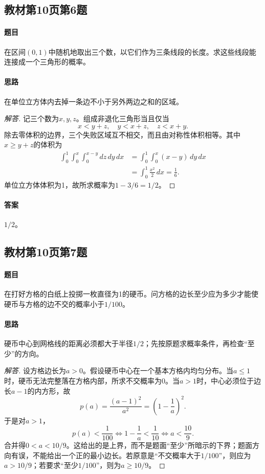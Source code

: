 \subsection{教材第10页第6题}\label{ex:w01-t6}
\paragraph{题目}
在区间$(0,1)$中随机地取出三个数，以它们作为三条线段的长度。求这些线段能连接成一个三角形的概率。
\paragraph{思路}在单位立方体内去掉一条边不小于另外两边之和的区域。
\begin{proof}[解答]
记三个数为$x,y,z$。组成非退化三角形当且仅当
\[x<y+z,\quad y<x+z,\quad z<x+y.\]
除去零体积的边界，三个失败区域互不相交，而且由对称性体积相等。其中$x\geq y+z$的体积为
\begin{align*}
\int_0^1\int_0^x\int_0^{x-y} dz\,dy\,dx
&=\int_0^1\int_0^x(x-y)\,dy\,dx\\
&=\int_0^1\frac{x^2}{2}\,dx=\frac16.
\end{align*}
单位立方体体积为1，故所求概率为$1-3/6=1/2$。
\end{proof}
\paragraph{答案}$1/2$。

\subsection{教材第10页第7题}\label{ex:w01-t7}
\paragraph{题目}
在打好方格的白纸上投掷一枚直径为1的硬币。问方格的边长至少应为多少才能使硬币与方格的边不交的概率小于$1/100$。
\paragraph{思路}硬币中心到网格线的距离必须都大于半径$1/2$；先按原题求概率条件，再检查“至少”的方向。
\begin{proof}[解答]
设方格边长为$a>0$。假设硬币中心在一个基本方格内均匀分布。当$a\leq1$时，硬币无法完整落在方格内部，所求不交概率为0。当$a>1$时，中心必须位于边长$a-1$的内方形，故
\[p(a)=\frac{(a-1)^2}{a^2}=\left(1-\frac1a\right)^2.\]
于是对$a>1$，
\[p(a)<\frac1{100}\iff 1-\frac1a<\frac1{10}\iff a<\frac{10}{9}.\]
合并得$0<a<10/9$。这给出的是上界，而不是题面“至少”所暗示的下界；题面方向有误，不能给出一个正的最小边长。若原意是“不交概率大于$1/100$”，则应为$a>10/9$；若要求“至少$1/100$”，则为$a\geq10/9$。
\end{proof}
